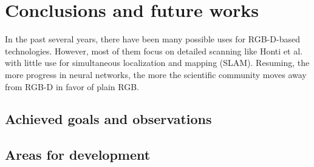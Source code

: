 
\chapter{Conclusions and future works} \label{chap:conclusions}

In the past several years, there have been many possible uses for RGB-D-based technologies.
However, most of them focus on detailed scanning like Honti et al. \cite{articleRecentRGBD}
with little use for simultaneous localization and mapping (SLAM).
Resuming, the more progress in neural networks,
the more the scientific community moves away from RGB-D in favor of plain RGB.

\section{Achieved goals and observations}

\bt 

\section{Areas for development}

\bt

